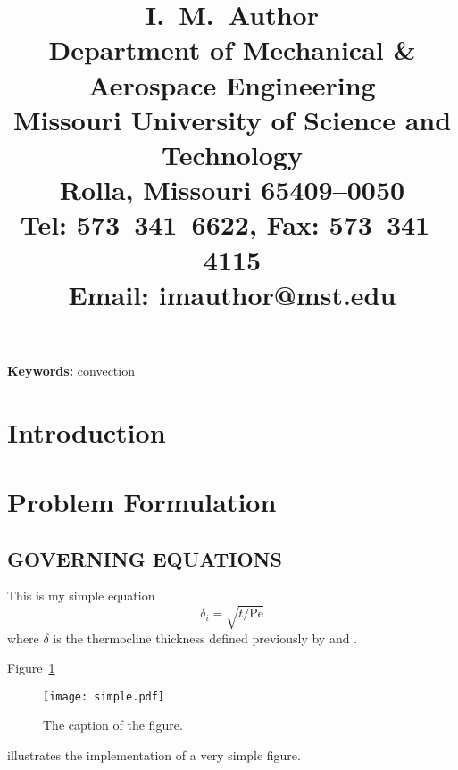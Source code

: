 \documentclass{article}
\newcommand{\ThesisPaperAuthor}[1]{\title{#1}}
\newenvironment{ThesisPaperAbstract}{\begin{abstract}}{\end{abstract}}
\newcommand{\ThesisPaperKeywords}[1]{\textbf{Keywords:} #1}
\begin{document}

\ThesisPaperAuthor{%
 I.\ M.\ Author\\%
 Department of Mechanical \& Aerospace Engineering\\
 Missouri University of Science and Technology\\
 Rolla, Missouri 65409--0050\\
 Tel: 573--341--6622, Fax: 573--341--4115\\
 Email: imauthor@mst.edu%
}




\begin{ThesisPaperAbstract}
\lipsum[52-55]
\end{ThesisPaperAbstract}


\ThesisPaperKeywords{convection}


\section{Introduction}

\lipsum[52-55]


\section{Problem Formulation}%
  \label{sec:formulation}

\lipsum[56]
\subsection{GOVERNING EQUATIONS}

This is my simple equation
\begin{equation}
\delta_i = \sqrt{t/\mathrm{Pe}}
\end{equation}
where $\delta$ is the thermocline
thickness %
defined previously by \citep{bullwinkle.1990} and
\citet{winkle.1991}. \lipsum[57-60]

Figure~\ref{fig:fig01} %
\begin{figure}[t]
  \begin{center}
  \texttt{[image: simple.pdf]}
  \end{center}
  \caption{The caption of the figure.}
\label{fig:fig01}
\end{figure}
illustrates the implementation of a very simple figure. \lipsum[61-65]
\end{document}
